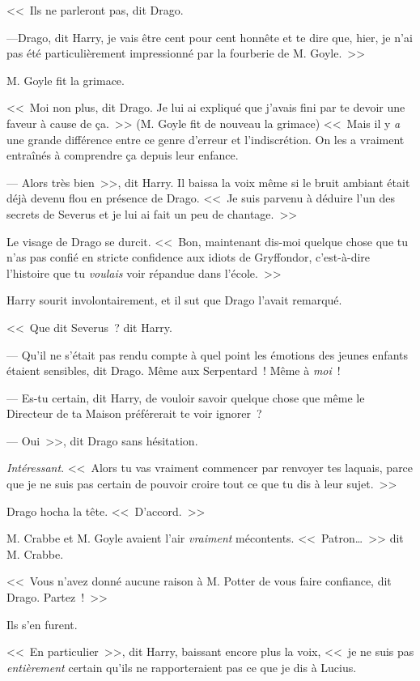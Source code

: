 <<~Ils ne parleront pas, dit Drago.

---Drago, dit Harry, je vais être cent pour cent honnête et te dire que, hier, je n'ai pas été particulièrement impressionné par la fourberie de M. Goyle.~>>

M. Goyle fit la grimace.

<<~Moi non plus, dit Drago. Je lui ai expliqué que j'avais fini par te devoir une faveur à cause de ça.~>> (M. Goyle fit de nouveau la grimace) <<~Mais il y \emph{a} une grande différence entre ce genre d'erreur et l'indiscrétion. On les a vraiment entraînés à comprendre ça depuis leur enfance.

--- Alors très bien~>>, dit Harry. Il baissa la voix même si le bruit ambiant était déjà devenu flou en présence de Drago. <<~Je suis parvenu à déduire l'un des secrets de Severus et je lui ai fait un peu de chantage.~>>

Le visage de Drago se durcit. <<~Bon, maintenant dis-moi quelque chose que tu n'as pas confié en stricte confidence aux idiots de Gryffondor, c'est-à-dire l'histoire que tu \emph{voulais} voir répandue dans l'école.~>>

Harry sourit involontairement, et il sut que Drago l'avait remarqué.

<<~Que dit Severus~? dit Harry.

--- Qu'il ne s'était pas rendu compte à quel point les émotions des jeunes enfants étaient sensibles, dit Drago. Même aux Serpentard~! Même à \emph{moi}~!

--- Es-tu certain, dit Harry, de vouloir savoir quelque chose que même le Directeur de ta Maison préférerait te voir ignorer~?

--- Oui~>>, dit Drago sans hésitation.

\emph{Intéressant}. <<~Alors tu vas vraiment commencer par renvoyer tes laquais, parce que je ne suis pas certain de pouvoir croire tout ce que tu dis à leur sujet.~>>

Drago hocha la tête. <<~D'accord.~>>

M. Crabbe et M. Goyle avaient l'air \emph{vraiment} mécontents. <<~Patron…~>> dit M. Crabbe.

<<~Vous n'avez donné aucune raison à M. Potter de vous faire confiance, dit Drago. Partez~!~>>

Ils s'en furent.

<<~En particulier~>>, dit Harry, baissant encore plus la voix, <<~je ne suis pas \emph{entièrement} certain qu'ils ne rapporteraient pas ce que je dis à Lucius.

